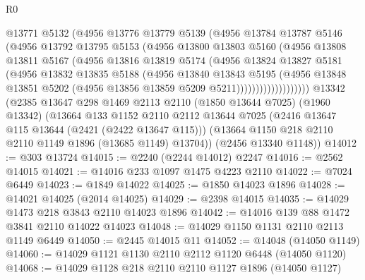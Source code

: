 \begin{lexlean}{R0}
\begin{coremodule}
                    @13771
                    @5132
                    (@4956
                      @13776
                      @13779
                      @5139
                      (@4956
                        @13784
                        @13787
                        @5146
                        (@4956
                          @13792
                          @13795
                          @5153
                          (@4956
                            @13800
                            @13803
                            @5160
                            (@4956
                              @13808
                              @13811
                              @5167
                              (@4956
                                @13816
                                @13819
                                @5174
                                (@4956
                                  @13824
                                  @13827
                                  @5181
                                  (@4956
                                    @13832
                                    @13835
                                    @5188
                                    (@4956
                                      @13840
                                      @13843
                                      @5195
                                      (@4956
                                        @13848
                                        @13851
                                        @5202
                                        (@4956 @13856 @13859 @5209 @5211)))))))))))))))))))
    @13342
    (@2385
      @13647
      @298
      @1469
      @2113
      @2110
      (@1850 @13644 @7025)
      (@1960 @13342)
      (@13664
        @133
        @1152
        @2110
        @2112
        @13644
        @7025
        (@2416 @13647 @115 @13644 (@2421 (@2422 @13647 @115)))
        (@13664 @1150 @218 @2110 @2110 @1149 @1896 (@13685 @1149) @13704))
      (@2456 @13340 @1148))
@14012 := @303 @13724
@14015 := @2240 (@2244 @14012) @2247
@14016 := @2562 @14015
@14021 := @14016 @233 @1097 @1475 @4223 @2110
@14022 := @7024 @6449
@14023 := @1849 @14022
@14025 := @1850 @14023 @1896
@14028 := @14021 @14025 (@2014 @14025)
@14029 := @2398 @14015
@14035 := @14029 @1473 @218 @3843 @2110 @14023 @1896
@14042 := @14016 @139 @88 @1472 @3841 @2110 @14022 @14023
@14048 := @14029 @1150 @1131 @2110 @2113 @1149 @6449
@14050 := @2445 @14015 @11
@14052 := @14048 (@14050 @1149)
@14060 := @14029 @1121 @1130 @2110 @2112 @1120 @6448 (@14050 @1120)
@14068 := @14029 @1128 @218 @2110 @2110 @1127 @1896 (@14050 @1127)

\end{coremodule}
\end{lexlean}
